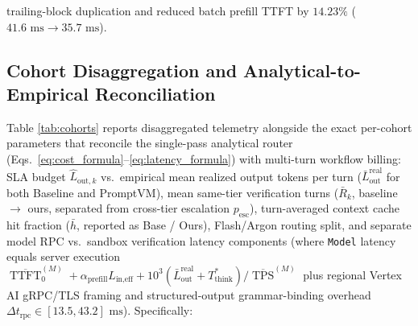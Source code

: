 \documentclass[conference,10pt]{IEEEtran}
\begin{document}
trailing-block duplication and reduced batch prefill TTFT by $14.23\%$ ($41.6\text{ ms} \to 35.7\text{ ms}$).

\subsection{Cohort Disaggregation and Analytical-to-Empirical Reconciliation}
Table \ref{tab:cohorts} reports disaggregated telemetry alongside the exact per-cohort parameters that reconcile the single-pass analytical router (Eqs.~\ref{eq:cost_formula}--\ref{eq:latency_formula}) with multi-turn workflow billing: SLA budget $\hat{L}_{\text{out},k}$ vs.\ empirical mean realized output tokens per turn ($\bar{L}_{\text{out}}^{\text{real}}$ for both Baseline and PromptVM), mean same-tier verification turns ($\bar{R}_k$, baseline $\to$ ours, separated from cross-tier escalation $p_{\text{esc}}$), turn-averaged context cache hit fraction ($\bar{h}$, reported as Base / Ours), Flash/Argon routing split, and separate model RPC vs.\ sandbox verification latency components (where \texttt{Model} latency equals server execution $\overline{\operatorname{TTFT}}_0^{(M)} + \alpha_{\text{prefill}} L_{\text{in,eff}} + 10^3(\bar{L}_{\text{out}}^{\text{real}} + T_{\text{think}}^*)/\overline{\operatorname{TPS}}^{(M)}$ plus regional Vertex AI gRPC/TLS framing and structured-output grammar-binding overhead $\Delta t_{\text{rpc}} \in [13.5, 43.2]\text{ ms}$). Specifically:
\end{document}
